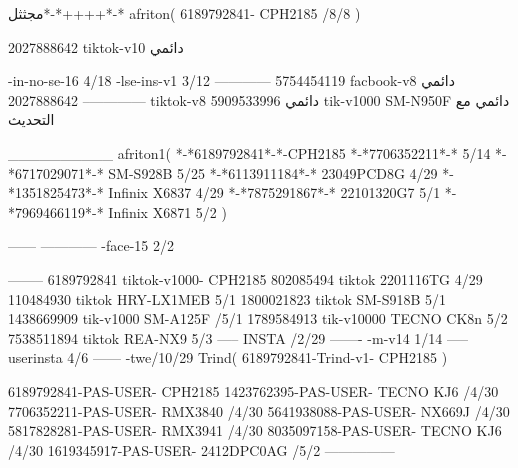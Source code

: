 مجثثل*-*++++*-*
afriton(
6189792841- CPH2185  /8/8
)

2027888642 tiktok-v10
دائمي

-in-no-se-16 4/18
-lse-ins-v1 3/12
------------
5754454119 facbook-v8
دائمي
--------------
2027888642 tiktok-v8
دائمي
5909533996 tik-v1000  SM-N950F
دائمي مع التحديث

__________
afriton1(
*-*6189792841*-*-CPH2185
*-*7706352211*-* 5/14
*-*6717029071*-*  SM-S928B 5/25
*-*6113911184*-* 23049PCD8G 4/29
*-*1351825473*-* Infinix X6837 4/29
*-*7875291867*-* 22101320G7 5/1
*-*7969466119*-* Infinix X6871 5/2
)


------
------------
-face-15 2/2

--------
6189792841 tiktok-v1000- CPH2185 
802085494 tiktok 2201116TG  4/29
110484930 tiktok HRY-LX1MEB  5/1
1800021823 tiktok SM-S918B  5/1
1438669909 tik-v1000 SM-A125F /5/1
1789584913 tik-v10000  TECNO CK8n 5/2
7538511894 tiktok REA-NX9  5/3
-----
 INSTA /2/29
-------
-m-v14 1/14
-----
userinsta 4/6
------
-twe/10/29
Trind(
6189792841-Trind-v1- CPH2185 
)

6189792841-PAS-USER- CPH2185 
1423762395-PAS-USER- TECNO KJ6 /4/30
7706352211-PAS-USER- RMX3840 /4/30
5641938088-PAS-USER- NX669J /4/30
5817828281-PAS-USER- RMX3941 /4/30
8035097158-PAS-USER- TECNO KJ6 /4/30
1619345917-PAS-USER- 2412DPC0AG /5/2
    ---------------
